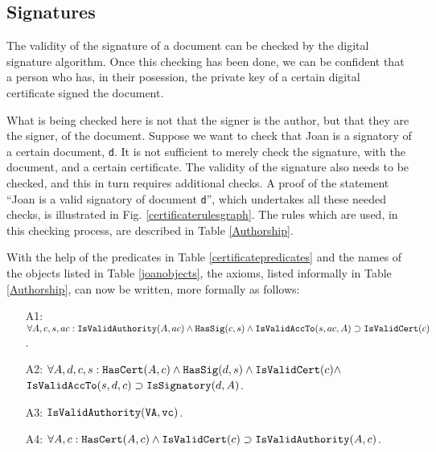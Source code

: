 \subsection{Signatures}
The validity of the signature of
a document can be checked by the digital signature algorithm.
Once this checking has been done, we can be confident that a person
who has, in their posession, the private key of a certain digital certificate
signed the document. 

What is being checked here is not that the signer is the author, but that they 
are the signer, of the document. Suppose we want to check that Joan is a signatory
of a certain document, {\tt d}. It is not sufficient to merely check the signature,
with the document, and a certain certificate. The validity of the signature also needs
to be checked, and this in turn requires additional checks.
A proof of the statement ``Joan is a valid signatory of document {\tt d}'', which undertakes
all these needed checks, is illustrated in Fig. \ref{certificaterulesgraph}. 
The rules which are used, in this checking process, are described in Table \ref{Authorship}.

With the help of the predicates in Table \ref{certificatepredicates} and the names
of the objects listed in Table \ref{joanobjects}, the 
axioms, listed informally in Table \ref{Authorship}, can now be written, more formally as follows:
\begin{itemize}
		\item[A1:]\label{A1a} 
$\forall A, c, s, ac:\hbox{\tt IsValidAuthority}(A,ac) \wedge \hbox{\tt HasSig}(c,s) \\
	\wedge \hbox{\tt IsValidAccTo}(s,ac,A) \supset \hbox{\tt IsValidCert}(c)$.
	\item[A2:] $\forall A, d, c, s: \hbox{\tt HasCert}(A,c) \wedge \hbox{\tt HasSig}(d,s) \\
	\wedge \hbox{\tt IsValidCert}(c) \wedge$\\
${\tt IsValidAccTo}(s,d,c) \supset \hbox{\tt IsSignatory}(d,A)$.
	\item[A3:] $\hbox{\tt IsValidAuthority}(\hbox{\tt VA},{\tt vc})$.
	\item[A4:] $\forall A, c:\hbox{\tt HasCert}(A,c) \wedge \hbox{\tt IsValidCert}(c) \supset \hbox{\tt IsValidAuthority}(A,c)$.
\end{itemize}

